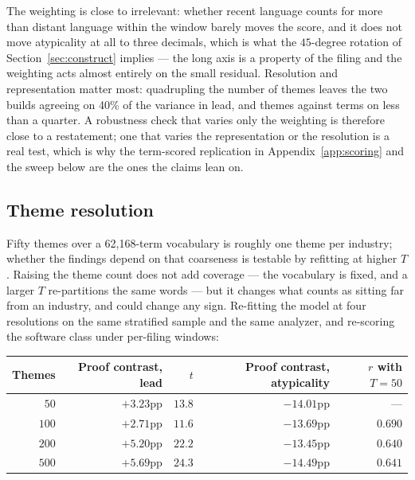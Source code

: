 \noindent The weighting is close to irrelevant: whether recent language counts
for more than distant language within the window barely moves the score, and it
does not move atypicality at all to three decimals, which is what the
$45$-degree rotation of Section~\ref{sec:construct} implies --- the long axis is
a property of the filing and the weighting acts almost entirely on the small
residual. Resolution and representation matter
most: quadrupling the number of themes leaves the two builds agreeing on 40\%
of the variance in lead, and themes against terms on less than a quarter. A
robustness check that varies only the weighting is therefore close to a
restatement; one that varies the representation or the resolution is a real
test, which is why the term-scored replication in Appendix~\ref{app:scoring}
and the sweep below are the ones the claims lean on.

\subsection{Theme resolution}

Fifty themes over a 62,168-term vocabulary is roughly one theme per
industry; whether the findings depend on that coarseness is testable by
refitting at higher $T$. Raising the theme count does not add coverage --- the
vocabulary is fixed, and a larger $T$ re-partitions the same words --- but it
changes what counts as sitting far from an industry, and could change any sign.
Re-fitting the model at four resolutions on the same stratified sample and the
same analyzer, and re-scoring the software class under per-filing windows:

\begin{center}\small
\begin{tabular}{rrrrr}
\toprule
Themes & Proof contrast, lead & $t$ & Proof contrast, atypicality & $r$ with $T=50$ \\
\midrule
$50$   & $+3.23$pp & $13.8$ & $-14.01$pp & --- \\
$100$  & $+2.71$pp & $11.6$ & $-13.69$pp & $0.690$ \\
$200$  & $+5.20$pp & $22.2$ & $-13.45$pp & $0.640$ \\
$500$  & $+5.69$pp & $24.3$ & $-14.49$pp & $0.641$ \\
\bottomrule
\end{tabular}
\end{center}

